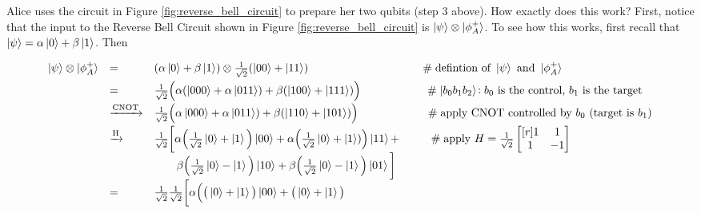 \documentclass{article}
\theoremstyle{definition}
\begin{document}
\bigskip
\noindent
Alice uses the circuit in Figure \ref{fig:reverse_bell_circuit}
to prepare her two qubits (step 3 above). How exactly does this work? 
First, notice that the input to the Reverse Bell Circuit shown in 
Figure \ref{fig:reverse_bell_circuit} is $\ket{\psi} \otimes \ket{\phi^{+}_A}$. 
To see how this works, first recall that $\ket{\psi} = \alpha \ket{0} + \beta \ket{1}$.  
Then 




{\footnotesize
\begin{equation*}
\begin{array}{llllll}
\ket{\psi} \otimes \ket{\phi^{+}_A} 
&=& (\alpha \ket{0} + \beta \ket{1}) \otimes \frac{1}{\sqrt{2}} (\ket{00} + \ket{11})
		\hspace{3.5cm} \mathrel{\#} \text{defintion of } \ket{\psi} \text{ and } \ket{\phi^{+}_A} \\
[5pt]
&=& \frac{1}{\sqrt{2}} \Big ( \alpha (\ket{000} + \alpha \ket{011}) + \beta (\ket{100} + \ket{111}) \Big )
		\hspace{2.0cm} \mathrel{\#} \ket{b_0b_1b_2}\!: b_0 \text{ is the control, } b_1  \text{ is the target} \\
[5pt]
&\xrightarrow {\scriptsize \text{CNOT}}& \frac{1}{\sqrt{2}} \Big ( \alpha \ket{000} + \alpha \ket{011}) + 
		\beta (\ket{110} + \ket{101}) \Big ) 
		\hspace{2.1cm} \mathrel{\#} \text{apply CNOT controlled by $b_0$ (target is $b_1$)} \\
[5pt]
&\xrightarrow {\scriptsize \text{H}}&\frac{1}{\sqrt{2}} \bigg [ \alpha 
		\Big ( \frac{1}{\sqrt{2}} \ket{0} + \ket{1} \Big ) \ket{00} + 
		\alpha \Big (  \frac{1}{\sqrt{2}} \ket{0} + \ket{1}) \Big )  \ket{11} + 
		\hspace{0.90cm} \mathrel{\#} \text{apply } H = \frac{1}{\sqrt{2}}  \begin{bmatrix}[r] 1 & 1 \\ 1 &  -1 \end{bmatrix}  \\
		&& \qquad \beta \Big ( \frac{1}{\sqrt{2}} \ket{0} - \ket{1} \Big ) \ket{10} + 
		\beta \Big (  \frac{1}{\sqrt{2}} \ket{0} - \ket{1} \Big )  \ket{01}  \bigg ] \\
[5pt]
&=&\frac{1}{\sqrt{2}} \frac{1}{\sqrt{2}}  
		\bigg [ \alpha \Big ( \big (\ket{0} + \ket{1} \big ) \ket{00} +  \big (\ket{0} + \ket{1} \big )  

\end{array}
\end{equation*}}
\end{document}
